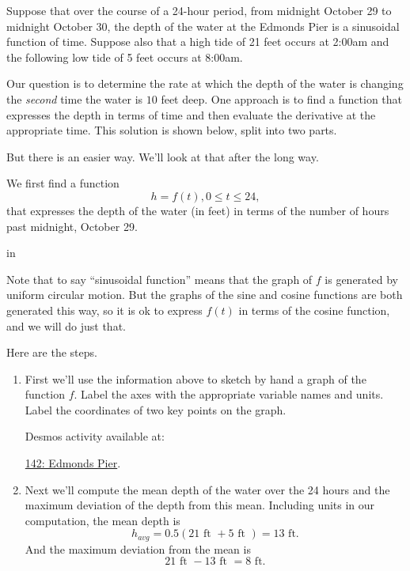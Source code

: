 \documentclass{ximera}
\newcommand{\pskip}{\vskip 0.1 in}
\begin{document}
\begin{example}  \label{E888b0bbdsdsf}
Suppose that over the course of a 24-hour period, from midnight October 29 to midnight October 30, the depth of the water at the Edmonds Pier is a sinusoidal function of time. Suppose also that a high tide of 21 feet occurs at 2:00am and the following low tide of 5 feet occurs at 8:00am. 

Our question is to determine the rate at which the depth of the water is changing the \emph{second} time the water is $10$ feet deep. One approach is to find a function that expresses the depth in terms of time and then evaluate the derivative at the appropriate time. This solution is shown below, split into two parts.

But there is an easier way. We'll look at that after the long way.


\begin{explanation}
We first find a function
\[
    h = f(t) , 0\leq t \leq 24, 
\]
that expresses the depth of the water (in feet) in terms of the number of hours past midnight, October 29. 

\pskip

Note that to say ``sinusoidal function'' means that the graph of $f$ is generated by uniform circular motion. But the graphs of the sine and cosine functions are both generated this way, so it is ok to express $f(t)$ in terms of the cosine function, and we will do just that.

Here are the steps.

\begin{enumerate}

\item  First we'll use the information above to sketch by hand a graph of the function $f$. Label the axes with the appropriate variable names and units. Label the coordinates of two key points on the graph.

Desmos activity available at:

\href{https://www.desmos.com/calculator/x2kocpkcfm}{142: Edmonds Pier}.

 
\begin{onlineOnly}
    \begin{center}
\end{center}
\end{onlineOnly}



\item Next we'll compute the mean depth of the water over the 24 hours and the maximum deviation of the depth from this mean. Including units in our computation, the mean depth is 
\[
    h_{avg} = 0.5 ( 21 \text{ ft } + 5 \text{ ft }) = 13 \text{ ft} . 
\]
And the maximum deviation from the mean is
\[
     21 \text{ ft } - 13 \text{ ft } = 8 \text{ ft}.
\]


\end{enumerate}
\end{explanation}
\end{example}
\end{document}
